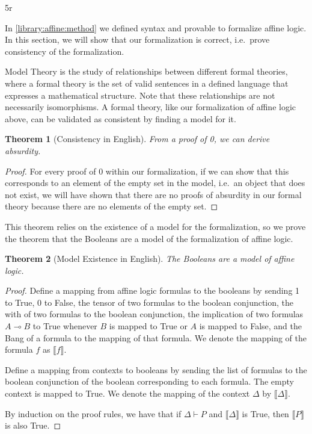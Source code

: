 5r\documentclass{article}
\newtheorem{thm}{Theorem}
\theoremstyle{definition}
\begin{document}
In \autoref{library:affine:method} we defined syntax and provable to formalize affine logic. In this section, we will show that our formalization is correct, i.e.\ prove consistency of the formalization. 

Model Theory is the study of relationships between different formal theories, where a formal theory is the set of valid sentences in a defined language that expresses a mathematical structure. Note that these relationships are not necessarily isomorphisms. A formal theory, like our formalization of affine logic above, can be validated as consistent by finding a model for it. 

\setcounter{thmconsistency}{\value{thm}}
\begin{thm}[Consistency in English]
From a proof of 0, we can derive absurdity.
\end{thm}
\begin{proof}
For every proof of 0 within our formalization, if we can show that this corresponds to an element of the empty set in the model, i.e.\ an object that does not exist, we will have shown that there are no proofs of absurdity in our formal theory because there are no elements of the empty set. 
\end{proof}

This theorem relies on the existence of a model for the formalization, so we prove the theorem that the Booleans are a model of the formalization of affine logic. 

\setcounter{thmexistence}{\value{thm}}
\begin{thm}[Model Existence in English]
The Booleans are a model of affine logic. 
\end{thm}
\begin{proof}
Define a mapping from affine logic formulas to the booleans by sending 1 to True, 0 to False, the tensor of two formulas to the boolean conjunction, the with of two formulas to the boolean conjunction, the implication of two formulas $A \multimap B$ to True whenever $B$ is mapped to True or $A$ is mapped to False, and the Bang of a formula to the mapping of that formula. We denote the mapping of the formula $f$ as $\llbracket f\rrbracket$.

Define a mapping from contexts to booleans by sending the list of formulas to the boolean conjunction of the boolean corresponding to each formula. The empty context is mapped to True. We denote the mapping of the context $\Delta$ by $\llbracket\Delta\rrbracket$.

By induction on the proof rules, we have that if $\Delta \vdash P$ and $\llbracket\Delta\rrbracket$ is True, then $\llbracket P\rrbracket$ is also True.
\end{proof}
\end{document}
